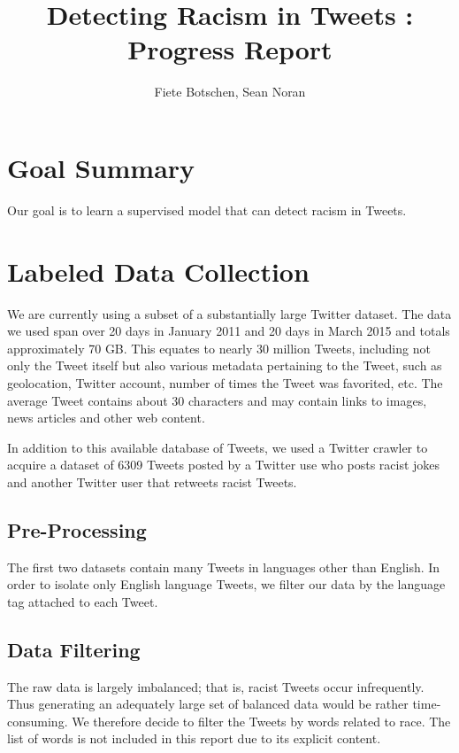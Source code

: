\documentclass[]{article}
\title{Detecting Racism in Tweets : Progress Report}
\author{Fiete Botschen, Sean Noran}
\begin{document}
\maketitle

\onehalfspacing

\section{Goal Summary}
Our goal is to learn a supervised model that can detect racism in Tweets.

\section{Labeled Data Collection}

We are currently using a subset of a substantially large Twitter dataset. The data we used span over 20 days in January 2011 and 20 days in March 2015 and totals approximately 70 GB. This equates to nearly 30 million Tweets, including not only the Tweet itself but also various metadata pertaining to the Tweet, such as geolocation, Twitter account, number of times the Tweet was favorited, etc. The average Tweet contains about 30 characters and may contain links to images, news articles and other web content.

In addition to this available database of Tweets, we used a Twitter crawler to acquire a dataset of 6309 Tweets posted by a Twitter use who posts racist jokes and another Twitter user that retweets racist Tweets.

\subsection{Pre-Processing}
The first two datasets contain many Tweets in languages other than English. In order to isolate only English language Tweets, we filter our data by the language tag attached to each Tweet.

\subsection{Data Filtering}

The raw data is largely imbalanced; that is, racist Tweets occur infrequently. Thus generating an adequately large set of balanced data would be rather time-consuming. We therefore decide to filter the Tweets by words related to race. The list of words is not included in this report due to its explicit content.
\end{document}
